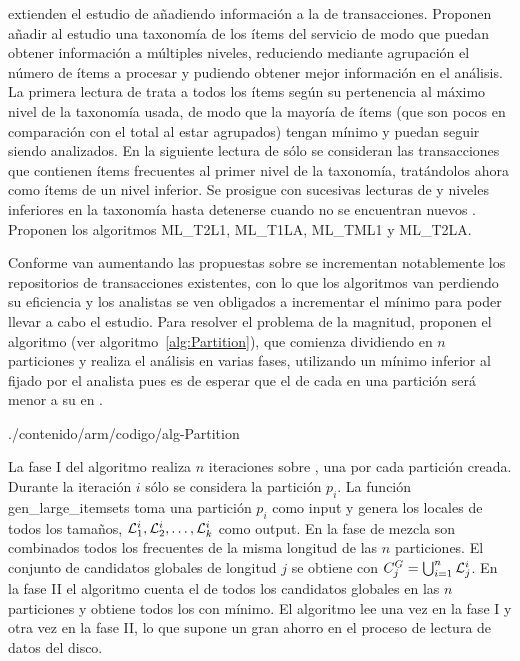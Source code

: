\citet{HanFu-DiscoveryMultipleLevelARFromLargeDB-1995} extienden el estudio de \ars añadiendo información a la \db de transacciones. Proponen añadir al estudio una taxonomía de los ítems del servicio de modo que puedan obtener información a múltiples niveles, reduciendo mediante agrupación el número de ítems a procesar y pudiendo obtener mejor información en el análisis. La primera lectura de \D trata a todos los ítems según su pertenencia al máximo nivel de la taxonomía usada, de modo que la mayoría de ítems (que son pocos en comparación con el total al estar agrupados) tengan \soporte mínimo y puedan seguir siendo analizados. En la siguiente lectura de \D sólo se consideran las transacciones que contienen ítems frecuentes al primer nivel de la taxonomía, tratándolos ahora como ítems de un nivel inferior. Se prosigue con sucesivas lecturas de \D y niveles inferiores en la taxonomía hasta detenerse cuando no se encuentran nuevos \kitemsets. Proponen los algoritmos {ML\_T2L1}, {ML\_T1LA}, {ML\_TML1} y {ML\_T2LA}.

Conforme van aumentando las propuestas sobre \ARM se incrementan notablemente los repositorios de transacciones existentes, con lo que los algoritmos van perdiendo su eficiencia y los analistas se ven obligados a incrementar el \soporte mínimo para poder llevar a cabo el estudio. Para resolver el problema de la magnitud, \citet{SavasereOmiecinskiNavathe-AnEfficientAlgorithmForARM-1995} proponen el algoritmo  (ver algoritmo~\ref{alg:Partition}), que comienza dividiendo \D en $n$ particiones y realiza el análisis en varias fases, utilizando un \soporte mínimo inferior al fijado por el analista pues es de esperar que el \soporte de cada \itemset en una partición será menor a su \soporte en \D.


                 {./contenido/arm/codigo/alg-Partition}

La fase I del algoritmo realiza $n$ iteraciones sobre \D, una por cada partición creada. Durante la iteración $i$ sólo se considera la partición $p_i$. La función gen\_large\_itemsets toma una partición $p_i$ como input y genera los \kitemsets locales de todos los tamaños, $\aprioriL[1]^i,\aprioriL[2]^i,\ldots,\aprioriL[k]^i$ como output. En la fase de mezcla son combinados todos los \itemsets frecuentes de la misma longitud de las $n$ particiones. El conjunto de candidatos globales de longitud $j$ se obtiene con $C_j^G=\bigcup_{i=1}^n \aprioriL[j]^i$. En la fase II el algoritmo cuenta el \soporte de todos los candidatos globales en las $n$ particiones y obtiene todos los \itemsets con \soporte mínimo. El algoritmo lee \D una vez en la fase I y otra vez en la fase II, lo que supone un gran ahorro en el proceso de lectura de datos del disco.

